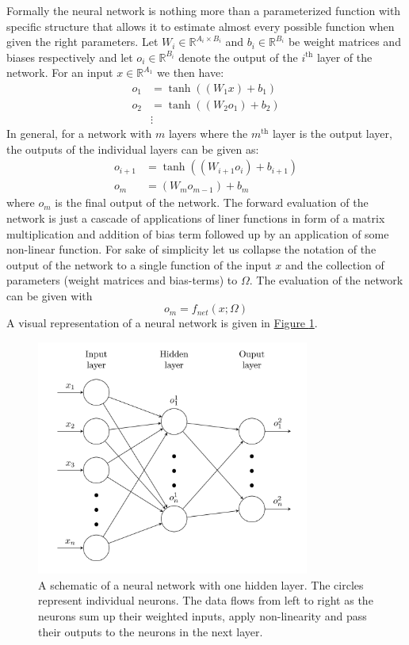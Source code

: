 \documentclass[12pt,a4paper,twoside]{scrartcl}
\numberwithin{equation}{section}
\newcommand{\reffig}[1]{\hyperref[#1]{Figure \ref*{#1}}}
\begin{document}
Formally the neural network is nothing more than a parameterized function with specific structure that allows it to estimate almost every possible function when given the right parameters. Let \(W_i \in \mathbb{R}^{A_i \times B_i }\) and \(b_i\in\mathbb{R}^{B_i}\) be weight matrices and biases respectively and let \(o_i\in\mathbb{R}^{B_i}\) denote the output of the \(i^\text{th}\) layer of the network. For an input \(x\in \mathbb{R}^{A_1}\) we then have:
\begin{align}
  o_{1} &= \tanh((W_{1}x) + b_{1}) \\
  o_{2} &= \tanh((W_{2}o_1) + b_{2}) \\
        &\vdots
\end{align}
In general, for a network with \(m\) layers where the \(m^{\text{th}}\) layer is the output layer, the outputs of the individual layers can be given as:
\begin{align}
  \label{eq:nn-ouput}
  o_{i+1}  &= \tanh((W_{i+1}o_i) + b_{i+1}) \\
  o_m     &= (W_{m}o_{m-1}) + b_{m}
\end{align}
where \(o_m \) is the final output of the network. The forward evaluation of the network is just a cascade of applications of liner functions in form of a matrix multiplication and addition of bias term followed up by an application of some non-linear function. For sake of simplicity let us collapse the notation of the output of the network to a single function of the input \(x\) and the collection of parameters (weight matrices and bias-terms) to \(\Omega\). The evaluation of the network can be given with
\begin{equation}
  o_m = f_{net}(x; \Omega)
\end{equation}
A visual representation of a neural network is given in \reffig{fig:nn}.
\begin{center}
  \begin{figure}[H]
    \centering
    \includegraphics[height=0.65\textwidth, width=0.8\textwidth]{figures/nn.png}
    \caption[Neural Network Schematic]{A schematic of a neural network with one hidden layer. The circles represent individual neurons. The data flows from left to right as the neurons sum up their weighted inputs, apply non-linearity and pass their outputs to the neurons in the next layer.}\label{fig:nn}
  \end{figure}
\end{center}
\end{document}
